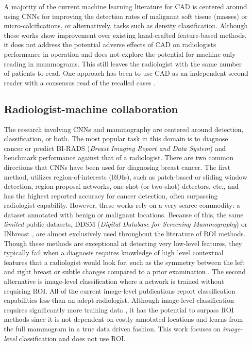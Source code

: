 \documentclass[journal]{IEEEtran}
\begin{document}
A majority of the current machine learning literature for CAD is centered around using CNNs for improving the detection rates of malignant soft tissue (masses) or micro-calcifications, or alternatively, tasks such as density classification.  Although these works show improvement over existing hand-crafted feature-based methods, it does not address the potential adverse effects of CAD on radiologists performance in operation and does not explore the potential for machine only reading in mammograms.  This still leaves the radiologist with the same number of patients to read. One approach has been to use CAD as an independent second reader with a consensus read of the recalled cases \cite{nishikawa-2018}.  

\subsection{Radiologist-machine collaboration}

The research involving CNNs and mammography are centered around detection, classification, or both.  The most popular task in this domain is to diagnose cancer or predict BI-RADS (\textit{Breast Imaging Report and Data System}) and benchmark performance against that of a radiologist.  There are two common directions that CNNs have been used for diagnosing breast cancer.  The first method, utilizes region-of-interests (ROIs), such as patch-based or sliding window detection, region proposal networks, one-shot (or two-shot) detectors, etc., and has the highest reported accuracy for cancer detection, often surpassing radiologist capability.  However, these works rely on a very scarce commodity: a dataset annotated with benign or malignant locations.  Because of this, the same \textit{limited} public datasets, DDSM (\textit{Digital Database for Screening Mammography}) or INbreast \cite{ddsm-database1}, are almost exclusively used throughout the literature of ROI methods.  Though these methods are exceptional at detecting very low-level features, they typically fail when a diagnosis requires knowledge of high level contextual features that a radiologist would look for, such as the symmetry between the left and right breast or subtle changes compared to a prior examination \cite{tommy-2015}.  The second alternative is image-level classification where a network is trained without requiring ROI.  All of the current image-level publications \cite{krysztof-etal-2017, carneiro-2015} report classification capabilities less than an adept radiologist.  Although image-level classification requires significantly more training data \cite{end-to-end-nips}, it has the potential to surpass ROI methods since it is not dependent on costly annotated locations and learns from the full mammogram in a true data driven fashion.    This work focuses on \textit{image-level} classification and does not use ROI. 
\end{document}
